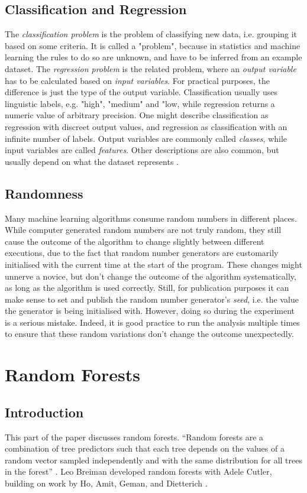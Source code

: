 \documentclass[a4paper,man,12pt,apacite,floatsintext,draftfirst]{apa6} %
\begin{document}
\subsection{Classification and Regression}
The \emph{classification problem} is the problem of classifying new data,
i.e. grouping it based on some criteria.
It is called a "problem", because in statistics and machine learning the
rules to do so are unknown, and have to be inferred from an example dataset.
The \emph{regression problem} is the related problem, where an
\emph{output variable} has to be calculated based on \emph{input variables}.
For practical purposes, the difference is just the type of the output variable.
Classification usually uses linguistic labels, e.g. "high", "medium" and "low,
while regression returns a numeric value of arbitrary precision.
One might describe classification as regression with discreet output values,
and regression as classification with an infinite number of labels.
Output variables are commonly called \emph{classes}, while input variables
are called \emph{features}.
Other descriptions are also common, but usually depend on what the dataset
represents \cite{strobl2009introduction}.

\subsection{Randomness}
Many machine learning algorithms consume random numbers in different places.
While computer generated random numbers are not truly random, they still
cause the outcome of the algorithm to change slightly between different
executions, due to the fact that random number generators are customarily
initialised with the current time at the start of the program.
These changes might unnerve a novice, but don't change the outcome of the
algorithm systematically, as long as the algorithm is used correctly.
Still, for publication purposes it can make sense to set and publish the
random number generator's \emph{seed}, i.e. the value the generator is being
initialised with.
However, doing so during the experiment
is a serious mistake.
Indeed, it is good practice to run the analysis multiple times to ensure
that these random variations don't change the outcome unexpectedly.

\newpage
\section{Random Forests}

\subsection{Introduction}
This part of the paper discusses random forests.
“Random forests are a combination of tree predictors such that each tree
depends on the values of a random vector sampled independently and with
the same distribution for all trees in the forest” \cite{breiman2001random}.
Leo Breiman developed random forests with Adele Cutler, building on work
by Ho, Amit, Geman, and Dietterich \cite{wpRF}.
\end{document}
